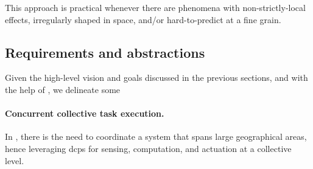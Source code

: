 This approach is practical whenever there are phenomena with non-strictly-local effects,
irregularly shaped in space,
and/or hard-to-predict at a fine grain.

\subsection{Requirements and abstractions}





Given the high-level vision and goals discussed in the previous sections, and with the help of \casename{},
 we delineate some 
%

\paragraph{ Concurrent collective task execution.} 
%
In \casename{},
there is the need to coordinate
  a system that spans large geographical areas,
  hence leveraging \acp{dcp} for sensing, computation, and actuation
  at a collective level.
%

